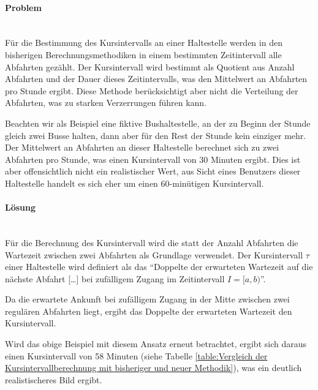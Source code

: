 \paragraph{Problem}~\\
Für die Bestimmung des Kursintervalls an einer Haltestelle werden in den bisherigen Berechnungsmethodiken in einem bestimmten Zeitintervall alle Abfahrten gezählt. Der Kursintervall wird bestimmt als Quotient aus Anzahl Abfahrten und der Dauer dieses Zeitintervalls, was den Mittelwert an Abfahrten pro Stunde ergibt.
Diese Methode berücksichtigt aber nicht die Verteilung der Abfahrten, was zu starken Verzerrungen führen kann.

Beachten wir als Beispiel eine fiktive Bushaltestelle, an der zu Beginn der Stunde gleich zwei Busse halten, dann aber für den Rest der Stunde kein einziger mehr.
Der Mittelwert an Abfahrten an dieser Haltestelle berechnet sich zu zwei Abfahrten pro Stunde, was einen Kursintervall von 30 Minuten ergibt.
Dies ist aber offensichtlich nicht ein realistischer Wert, aus Sicht eines Benutzers dieser Haltestelle handelt es sich eher um einen 60-minütigen Kursintervall.

\paragraph{Lösung}~\\
Für die Berechnung des Kursintervall wird die statt der Anzahl Abfahrten die Wartezeit zwischen zwei Abfahrten als Grundlage verwendet.
Der Kursintervall $\tau$ einer Haltestelle wird definiert als das "`Doppelte der erwarteten Wartezeit auf die nächste Abfahrt [\ldots] bei zufälligem Zugang im Zeitintervall $I = [a,b)$"'.~\cite{visum_manual_formula}

Da die erwartete Ankunft bei zufälligem Zugang in der Mitte zwischen zwei regulären Abfahrten liegt, ergibt das Doppelte der erwarteten Wartezeit den Kursintervall.

Wird das obige Beispiel mit diesem Ansatz erneut betrachtet, ergibt sich daraus einen Kursintervall von 58 Minuten (siehe Tabelle \ref{table:Vergleich der Kursintervallberechnung mit bisheriger und neuer Methodik}), was ein deutlich realistischeres Bild ergibt.

